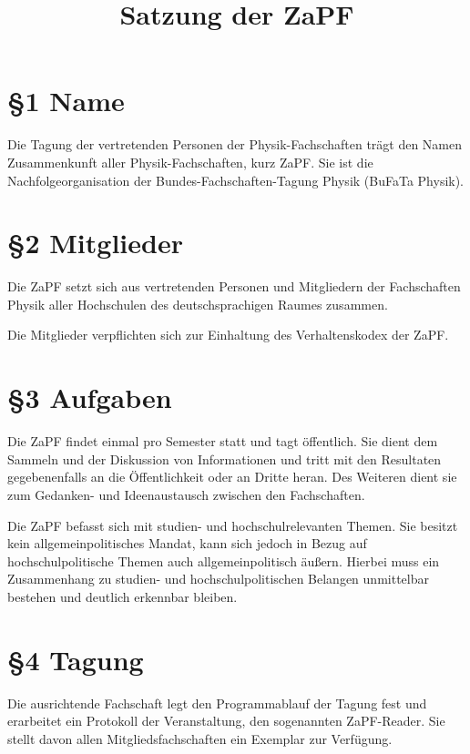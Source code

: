 \documentclass[12pt,oneside]{scrartcl}
\begin{document}
\title{Satzung der ZaPF%
  \label{satzung-der-zapf}}
\author{}
\date{}
\maketitle


\section{§1 Name%
  \label{name}%
}

Die Tagung der vertretenden Personen der Physik-Fachschaften trägt den Namen
Zusammenkunft aller Physik-Fachschaften, kurz ZaPF.
Sie ist die Nachfolgeorganisation der Bundes-Fachschaften-Tagung Physik (BuFaTa
Physik).


\section{§2 Mitglieder%
  \label{mitglieder}%
}

Die ZaPF setzt sich aus vertretenden Personen und Mitgliedern der Fachschaften
Physik aller Hochschulen des deutschsprachigen Raumes zusammen.

Die Mitglieder verpflichten sich zur Einhaltung des Verhaltenskodex der ZaPF.


\section{§3 Aufgaben%
  \label{aufgaben}%
}

Die ZaPF findet einmal pro Semester statt und tagt öffentlich.
Sie dient dem Sammeln und der Diskussion von Informationen und tritt mit den
Resultaten gegebenenfalls an die Öffentlichkeit oder an Dritte heran.
Des Weiteren dient sie zum Gedanken- und Ideenaustausch zwischen den
Fachschaften.

Die ZaPF befasst sich mit studien- und hochschulrelevanten Themen. Sie besitzt
kein allgemeinpolitisches Mandat, kann sich jedoch in Bezug auf
hochschulpolitische Themen auch allgemeinpolitisch äußern.
Hierbei muss ein Zusammenhang zu studien- und hochschulpolitischen Belangen
unmittelbar bestehen und deutlich erkennbar bleiben.


\section{§4 Tagung%
  \label{tagung}%
}

Die ausrichtende Fachschaft legt den Programmablauf der Tagung fest und
erarbeitet ein Protokoll der Veranstaltung, den sogenannten ZaPF-Reader.
Sie stellt davon allen Mitgliedsfachschaften ein Exemplar zur Verfügung.
\end{document}
